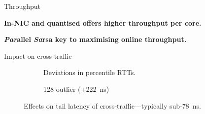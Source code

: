 \documentclass[aspectratio=169,xcolor={dvipsnames}
]{beamer}
\begin{document}
\begin{frame}{Throughput}
	\centering
	\pause
	
	\textbf{In-NIC and quantised offers \alert{higher throughput per core}.}\pause
	
	\textbf{\emph{Par}allel \emph{Sa}rsa key to maximising \alert{online} throughput.}
\end{frame}

\begin{frame}{Impact on cross-traffic}
	\centering
	\begin{figure}
		\centering
		\begin{subfigure}{0.45\linewidth}
			\caption{Deviations in  percentile RTTs.\label{fig:dataplane-heat}}
		\end{subfigure}
		\hspace{0.05\linewidth}
		\begin{subfigure}{0.45\linewidth}
			\caption{\SI{128}{\byte} outlier ($+$\SI{222}{\nano\second})}
		\end{subfigure}
		\caption{Effects on tail latency of cross-traffic---typically sub-\SI{78}{\nano\second}.\label{fig:dataplane-coop}}
	\end{figure}
\end{frame}
\end{document}
